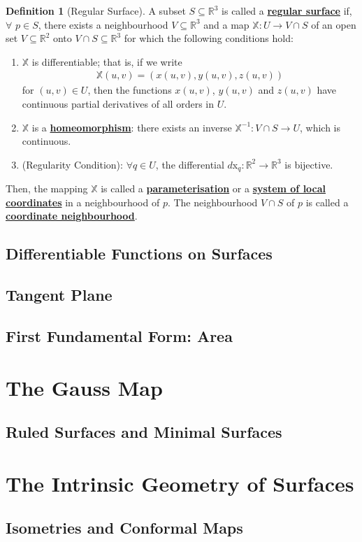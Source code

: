 \documentclass[11pt]{scrartcl}
\newcommand{\R}[0]{\mathbb{R}}
\theoremstyle{definition}
\newtheorem{definition}{Definition}
\theoremstyle{remark}
\newcommand{\dfn}[1]{\textbf{\underline{#1}}}
\begin{document}
\begin{definition}[Regular Surface]
	A subset $S \subseteq \R^3$ is called a \dfn{regular surface} if, $\forall$ $p \in S$, there exists a neighbourhood $V \subseteq \R^3$ and a map $\mathbb{X}: U \rightarrow V \cap S$ of an open set $V \subseteq \R^2$ onto $V \cap S \subseteq \R^3$ for which the following conditions hold: 
	\begin{enumerate}[noitemsep]
		\item $\mathbb{X}$ is differentiable; that is, if we write 
		\begin{align*}
			\mathbb{X}(u,v) = (x(u,v), y(u,v), z(u,v)) 
		\end{align*} 
		for $(u,v) \in U$, then the functions $x(u,v)$, $y(u,v)$ and $z(u,v)$ have continuous partial derivatives of all orders in $U$. 
		\item $\mathbb{X}$ is a \dfn{homeomorphism}: there exists an inverse $\mathbb{X}^{-1}: V \cap S \rightarrow U$, which is continuous. 
		\item (Regularity Condition): $\forall q \in U$, the differential $d$x$_q: \R^2 \rightarrow \R^3$ is bijective. 
	\end{enumerate}
	Then, the mapping $\mathbb{X}$ is called a \dfn{parameterisation}  or a \dfn{system of local coordinates} in a neighbourhood of $p$. The neighbourhood $V \cap S$ of $p$ is called a \dfn{coordinate neighbourhood}. 
\end{definition}

\subsection{Differentiable Functions on Surfaces}

\subsection{Tangent Plane}

\subsection{First Fundamental Form: Area}


\section{The Gauss Map}

\subsection{Ruled Surfaces and Minimal Surfaces}


\section{The Intrinsic Geometry of Surfaces}

\subsection{Isometries and Conformal Maps}
\end{document}

